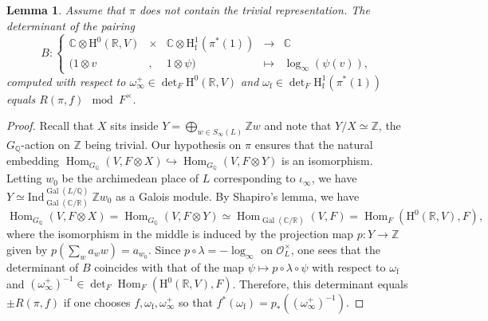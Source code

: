 \documentclass[12pt]{amsart}
\newcommand\bR{\mathbb{R}}
\newcommand\bC{\mathbb{C}}
\newcommand\bZ{\mathbb{Z}}
\newcommand\bQ{\mathbb{Q}}
\newcommand\cO{\mathcal{O}}
\newcommand{\Ind}{\mathrm{Ind}}
\DeclareMathOperator{\Gal}{Gal}
\DeclareMathOperator{\Hom}{Hom}
\newcommand{\HH}{\mathrm{H}}
\newcommand{\ff}{\mathrm{f}}
\theoremstyle{defstyle}
\theoremstyle{thmstyle}
\newtheorem{lemme}[subsubsection]{Lemma}
\begin{document}
\begin{lemme}\label{lem:stark}
	Assume that $\pi$ does not contain the trivial representation. The determinant of the pairing 
	\begin{equation*}
		B\colon\left\{\begin{array}{rclcc} \bC \otimes \HH^0(\bR,V) & \times& \bC \otimes \HH^1_\ff(\pi^*(1)) &\longrightarrow &\bC \\
			(1 \otimes v &,&1\otimes \psi) &\mapsto & \log_\infty(\psi(v)),
		\end{array}\right.
	\end{equation*}
	computed with respect to $\omega_\infty^+\in \det_F \HH^0(\bR,V)$ and $\omega_{\ff} \in \det_F \HH^1_\ff(\pi^*(1))$ equals $R(\pi,f) \mod F^\times$.
\end{lemme}
\begin{proof}
	 Recall that $X$ sits inside $Y=\bigoplus_{w\in S_\infty(L)} \bZ w$ and note that $Y/X\simeq \bZ$, the $G_{\bQ}$-action on $\bZ$ being trivial. Our hypothesis on $\pi$ ensures that the natural embedding $\Hom_{G_\bQ}(V,F\otimes X) \hookrightarrow \Hom_{G_\bQ}(V,F\otimes Y)$ is an isomorphism. Letting $w_0$ be the archimedean place of $L$ corresponding to $\iota_\infty$, we have $Y\simeq \Ind_{\Gal(\bC/\bR)}^{\Gal(L/\bQ)} \ \bZ w_0$ as a Galois module. By Shapiro's lemma, we have
	\[
	\Hom_{G_\bQ}(V,F\otimes X) = \Hom_{G_\bQ}(V,F\otimes Y) \simeq \Hom_{\Gal(\bC/\bR)}(V,F)=\Hom_F(\HH^0(\bR, V),F),
	\]
	where the isomorphism in the middle is induced by the projection map $p \colon Y \rightarrow \bZ$ given by $p(\sum_w a_w w)=a_{w_0}$. Since $p\circ \lambda=-\log_\infty$ on $\cO^\times_{L}$, one sees that the determinant of $B$ coincides with that of the map $\psi \mapsto p \circ \lambda \circ \psi$ with respect to $\omega_{\ff}$ and $(\omega_\infty^+)^{-1}\in \det_F \Hom_F(\HH^0(\bR, V),F)$. Therefore, this determinant equals $\pm R(\pi,f)$ if one chooses $f,\omega_{\ff},\omega_\infty^+$ so that $f^*(\omega_{\ff})=p_*((\omega_\infty^+)^{-1})$.
\end{proof}
\end{document}
